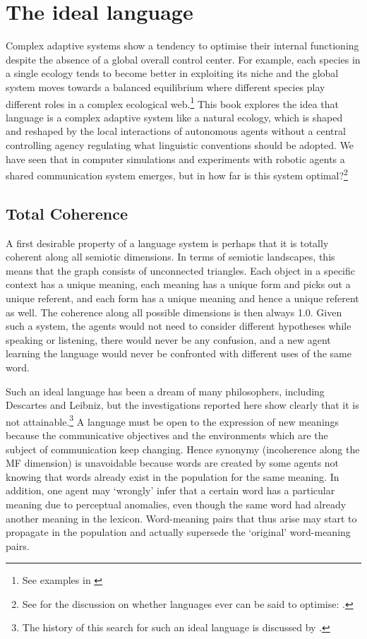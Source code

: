 \section{The ideal language}

Complex adaptive systems show a tendency to
optimise their internal functioning despite the absence of
a global overall control center. For example, 
each species in a single ecology tends to become 
better in exploiting its niche and the global system 
moves towards a balanced equilibrium where different
species play different roles in a complex ecological 
web.\footnote{See examples in \cite{Margulis:1991}} This book explores the idea that language 
is a complex adaptive system like a natural ecology, 
which is shaped and 
reshaped by the local interactions of autonomous 
agents without a central controlling agency regulating
what linguistic conventions should be adopted. 
We have seen that in computer simulations and experiments
with robotic agents a shared communication system 
emerges, but in how far is this system optimal?\footnote{
See for the discussion on whether languages ever
can be said to optimise: \cite{Kirby:1999}.} 

\subsection{Total Coherence}

A first desirable property of a language system 
is perhaps that it is totally coherent along all 
semiotic dimensions. 
In terms of semiotic landscapes, 
this means that the graph consists of unconnected triangles. 
Each object in a specific context has a unique
meaning, each meaning has a 
unique form and picks out a unique referent, and each form 
has a unique meaning and hence a unique referent as well. 
The coherence along all possible dimensions is then always
1.0. Given such a system, the agents would not need to
consider different hypotheses while speaking or listening, 
there would never be any confusion, and a new agent 
learning the language would never be confronted with 
different uses of the same word. 

Such an ideal language has been a dream of many 
philosophers, including Descartes and Leibniz, but 
the investigations reported here show clearly that 
it is not attainable.\footnote{The history of this search for such an ideal language
is discussed by \cite{Eco:1997}.}
A language must be open to the 
expression of new meanings because the communicative 
objectives and the environments which are the subject
of communication keep changing. Hence 
synonymy (incoherence along the MF dimension) is unavoidable
because words are created by some agents not knowing that 
words already exist in the population for the same meaning. 
In addition, one agent 
may `wrongly' infer that a certain word has a 
particular meaning due to perceptual anomalies, even though
the same word had already another meaning in the
lexicon. Word-meaning pairs that thus
arise may start to propagate 
in the population and actually supersede the `original' 
word-meaning pairs. 

